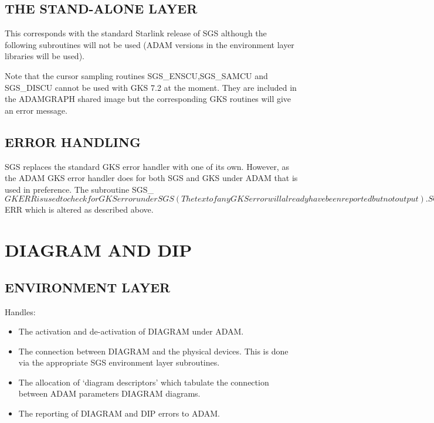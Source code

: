 \subsection{THE STAND-ALONE LAYER}
This corresponds with the standard Starlink release of SGS although the
following subroutines will not be used (ADAM versions in the environment
layer libraries will be used).
Note that the cursor sampling routines SGS\_ENSCU,SGS\_SAMCU and SGS\_DISCU
cannot be used with GKS 7.2 at the moment. They are included in the
ADAMGRAPH shared image but the corresponding GKS routines will give an
error message.

\subsection{ERROR HANDLING}
SGS replaces the standard GKS error handler with one of
its own. However, as the ADAM GKS error handler does for both SGS and GKS
under ADAM that is used in preference.
The subroutine SGS\_$GKERR is used to check for GKS error under SGS (The
text of any GKS error will already have been reported but not output).
SGS errors are reported via subroutine SGS\_$ERR which is altered as described
above.

\section{DIAGRAM AND DIP}

\subsection{ENVIRONMENT LAYER}
Handles:
\begin{itemize}
\item The activation and de-activation of DIAGRAM under ADAM.
\item The connection between DIAGRAM and the physical devices. This is done
via the appropriate SGS environment layer subroutines.
\item The allocation of `diagram descriptors' which tabulate the connection
between ADAM parameters DIAGRAM diagrams.
\item The reporting of DIAGRAM and DIP errors to ADAM.
\end{itemize}

